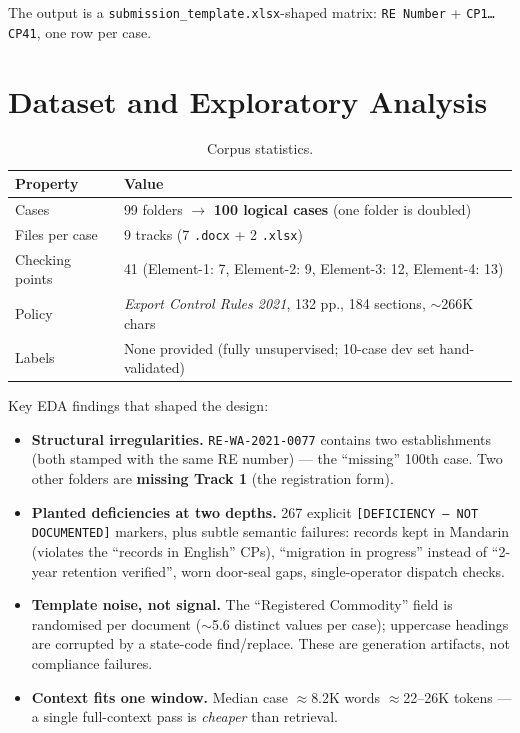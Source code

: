 \documentclass[11pt,a4paper]{article}
\begin{document}
The output is a \texttt{submission\_template.xlsx}-shaped matrix: \texttt{RE Number} + \texttt{CP1\ldots CP41}, one row per case.

\section{Dataset and Exploratory Analysis}
\begin{table}[htbp]\centering\small
\caption{Corpus statistics.}
\begin{tabular}{@{}ll@{}}
\toprule
\textbf{Property} & \textbf{Value} \\
\midrule
Cases & 99 folders $\rightarrow$ \textbf{100 logical cases} (one folder is doubled) \\
Files per case & 9 tracks (7 \texttt{.docx} + 2 \texttt{.xlsx}) \\
Checking points & 41 (Element-1: 7, Element-2: 9, Element-3: 12, Element-4: 13) \\
Policy & \emph{Export Control Rules 2021}, 132 pp., 184 sections, $\sim$266K chars \\
Labels & None provided (fully unsupervised; 10-case dev set hand-validated) \\
\bottomrule
\end{tabular}
\end{table}

Key EDA findings that shaped the design:
\begin{itemize}[itemsep=2pt]
  \item \textbf{Structural irregularities.} \texttt{RE-WA-2021-0077} contains two establishments (both stamped with the same RE number) --- the ``missing'' 100th case. Two other folders are \textbf{missing Track 1} (the registration form).
  \item \textbf{Planted deficiencies at two depths.} 267 explicit \texttt{[DEFICIENCY --- NOT DOCUMENTED]} markers, plus subtle semantic failures: records kept in Mandarin (violates the ``records in English'' CPs), ``migration in progress'' instead of ``2-year retention verified'', worn door-seal gaps, single-operator dispatch checks.
  \item \textbf{Template noise, not signal.} The ``Registered Commodity'' field is randomised per document ($\sim$5.6 distinct values per case); uppercase headings are corrupted by a state-code find/replace. These are generation artifacts, not compliance failures.
  \item \textbf{Context fits one window.} Median case $\approx$8.2K words $\approx$22--26K tokens --- a single full-context pass is \emph{cheaper} than retrieval.
\end{itemize}
\end{document}
